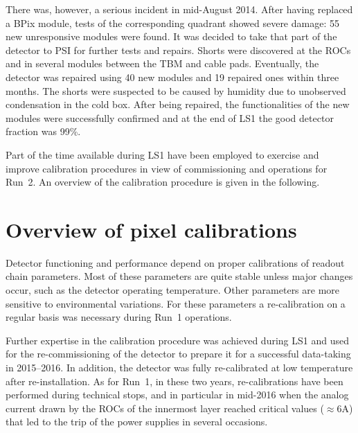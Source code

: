There was, however, a serious incident in mid-August 2014. After having replaced a BPix module, tests of the corresponding quadrant showed severe damage: 55 new unresponsive modules were found.
It was decided to take that part of the detector to PSI for further tests and repairs. Shorts were discovered at the ROCs and in several modules between the TBM and cable pads. Eventually, the detector was repaired using 40 new modules and 19 repaired ones within three months. The shorts were suspected to be caused by humidity due to unobserved condensation in the cold box. 
After being repaired, the functionalities of the new modules were successfully confirmed and at the end of LS1 the good detector fraction was 99\%.

Part of the time available during LS1 have been employed to exercise and improve calibration procedures in view of commissioning and operations for Run~2.
An overview of the calibration procedure is given in the following.

\section{Overview of pixel calibrations}

Detector functioning and performance depend on proper calibrations of readout chain parameters.
Most of these parameters are quite stable unless major changes occur, such as the detector operating temperature.
Other parameters are more sensitive to environmental variations.
For these parameters a re-calibration on a regular basis was necessary during Run~1 operations.

Further expertise in the calibration procedure was achieved during LS1 and used 
for the re-commissioning of the detector to prepare it for a successful data-taking in 2015--2016.
In addition, the detector was fully re-calibrated at low temperature after re-installation.
As for Run~1, in these two years, re-calibrations have been performed during technical stops, and in particular in mid-2016 when the analog current drawn by the ROCs of the innermost layer reached critical values ($\approx6$\unit{A}) that led to the trip of the power supplies in several occasions.

